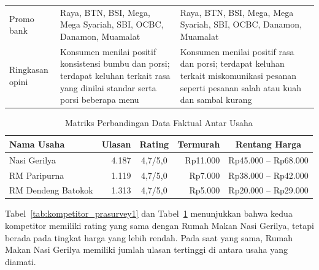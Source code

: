 \begin{table}[h!]
\begin{tabularx}{\textwidth}{p{3.5cm}YY}
        Promo bank         & Raya, BTN, BSI, Mega, Mega Syariah, SBI, OCBC, Danamon, Muamalat                                                                   & Raya, BTN, BSI, Mega, Mega Syariah, SBI, OCBC, Danamon, Muamalat                                                                          \\
        Ringkasan opini    & Konsumen menilai positif konsistensi bumbu dan porsi; terdapat keluhan terkait rasa yang dinilai standar serta porsi beberapa menu & Konsumen menilai positif rasa dan porsi; terdapat keluhan terkait miskomunikasi pesanan seperti pesanan salah atau kuah dan sambal kurang \\
        \bottomrule
    \end{tabularx}
\end{table}

\begin{table}[h!]
    \centering
    \caption{Matriks Perbandingan Data Faktual Antar Usaha}
    \label{tab:perbandingan_usaha}
    \begin{tabularx}{\textwidth}{lrcrc}
        \toprule
        \textbf{Nama Usaha} & \textbf{Ulasan} & \textbf{Rating} & \textbf{Termurah} & \textbf{Rentang Harga} \\
        \midrule
        Nasi Gerilya        & 4.187           & 4,7/5,0         & Rp11.000          & Rp45.000 -- Rp68.000   \\
        RM Paripurna        & 1.119           & 4,7/5,0         & Rp7.000           & Rp38.000 -- Rp42.000   \\
        RM Dendeng Batokok  & 1.313           & 4,7/5,0         & Rp5.000           & Rp20.000 -- Rp29.000   \\
        \bottomrule
    \end{tabularx}
\end{table}

\FloatBarrier
Tabel~\ref{tab:kompetitor_prasurvey1} dan Tabel~\ref{tab:perbandingan_usaha} menunjukkan bahwa kedua kompetitor memiliki rating yang sama dengan Rumah Makan Nasi Gerilya, tetapi berada pada tingkat harga yang lebih rendah. Pada saat yang sama, Rumah Makan Nasi Gerilya memiliki jumlah ulasan tertinggi di antara usaha yang diamati.

